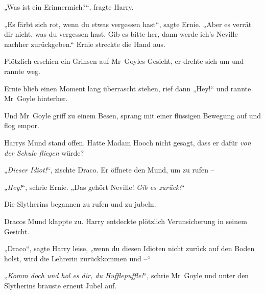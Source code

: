 „Was ist ein Erinnermich?“, fragte Harry.

„Es färbt sich rot, wenn du etwas vergessen hast“, sagte Ernie. „Aber es verrät dir nicht, was du vergessen hast. Gib es bitte her, dann werde ich’s Neville nachher zurückgeben.“ Ernie streckte die Hand aus.

Plötzlich erschien ein Grinsen auf Mr~Goyles Gesicht, er drehte sich um und rannte weg.

Ernie blieb einen Moment lang überrascht stehen, rief dann „Hey!“ und rannte Mr~Goyle hinterher.

Und Mr~Goyle griff zu einem Besen, sprang mit einer flüssigen Bewegung auf und flog empor.

Harrys Mund stand offen. Hatte Madam Hooch nicht gesagt, dass er dafür \emph{von der Schule fliegen} würde?

„\emph{Dieser Idiot!}“, zischte Draco. Er öffnete den Mund, um zu rufen –

„\emph{Hey!}“, schrie Ernie. „Das gehört Neville! \emph{Gib es zurück!}“

Die Slytherins begannen zu rufen und zu jubeln.

Dracos Mund klappte zu. Harry entdeckte plötzlich Verunsicherung in seinem Gesicht.

„Draco“, sagte Harry leise, „wenn du diesen Idioten nicht zurück auf den Boden holst, wird die Lehrerin zurückkommen und –“

„\emph{Komm doch und hol es dir, du Hufflepuffle!}“, schrie Mr~Goyle und unter den Slytherins brauste erneut Jubel auf.

